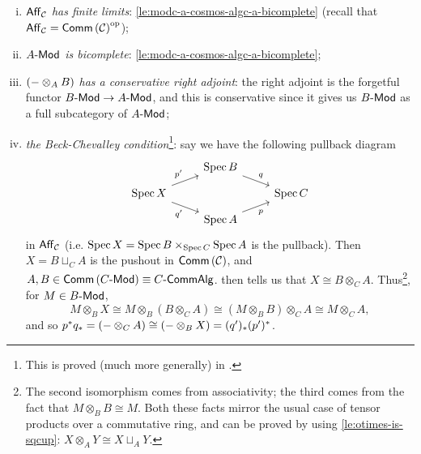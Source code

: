         \begin{enumerate}[(i)]
            \item \emph{$\mathsf{Aff}_{\mathcal{C}}$ has finite limits}: \cref{le:modc-a-cosmos-algc-a-bicomplete} (recall that $\mathsf{Aff}_{\mathcal{C}}={\mathsf{Comm}\left({\mathcal{C}}\right)}^{\mathrm{op}}$);
            \item \emph{${{A}\hbox{-}\mathsf{Mod}}$ is bicomplete}: \cref{le:modc-a-cosmos-algc-a-bicomplete};
            \item \emph{$({-}\otimes_A B)$ has a conservative right adjoint}: the right adjoint is the forgetful functor ${{B}\hbox{-}\mathsf{Mod}}\to{{A}\hbox{-}\mathsf{Mod}}$, and this is conservative since it gives us ${{B}\hbox{-}\mathsf{Mod}}$ as a full subcategory of ${{A}\hbox{-}\mathsf{Mod}}$;
            \item \emph{the Beck-Chevalley condition}\footnote{
                This is proved (much more generally) in \cite[Example~2.35]{Shulman:2013tx}.
            }: say we have the following pullback diagram
            \begin{equation*}
                \begin{tikzcd}[row sep=.7em]
                     & \spec B \arrow[dr, "q"] &\\
                    \spec X \arrow[ur, "p'"] \arrow[dr, swap, "q'"] & & \spec C\\
                     & \spec A \arrow[ur, swap, "p"] &
                \end{tikzcd}
            \end{equation*}
            in $\mathsf{Aff}_{\mathcal{C}}$ (i.e. $\operatorname{Spec} X=\operatorname{Spec} B\times_{\operatorname{Spec} C}\operatorname{Spec} A$ is the pullback).
            Then $X=B\sqcup_C A$ is the pushout in $\mathsf{Comm}\left({\mathcal{C}}\right)$, and $A,B\in\mathsf{Comm}\left({{{C}\hbox{-}\mathsf{Mod}}}\right)\equiv{{C}\hbox{-}\mathsf{CommAlg}}$.
             then tells us that $X\cong B\otimes_C A$.
            Thus\footnote{
                The second isomorphism comes from associativity; the third comes from the fact that $M\otimes_B B\cong M$.
                Both these facts mirror the usual case of tensor products over a commutative ring, and can be proved by using \cref{le:otimes-is-sqcup}: $X\otimes_A Y\cong X\sqcup_A Y$.
            }, for $M\in{{B}\hbox{-}\mathsf{Mod}}$,
            \begin{equation*}
                M\otimes_B X \cong M\otimes_B(B\otimes_C A) \cong (M\otimes_B B)\otimes_C A \cong M\otimes_C A,
            \end{equation*}
            and so $p^*q_*=({-}\otimes_C A)\cong({-}\otimes_B X)=(q')_*(p')^*$.
        \end{enumerate}

